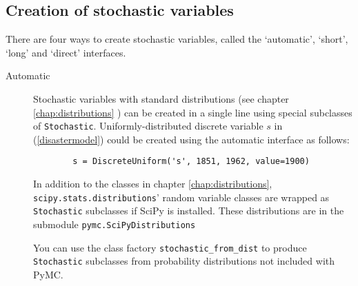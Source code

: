 \subsection{Creation of stochastic variables}
There are four ways to create stochastic variables, called the `automatic', `short', `long' and `direct' interfaces.

\begin{description}    
    \item[Automatic] Stochastic variables with standard distributions (see chapter \ref{chap:distributions} ) can be created in a single line using special subclasses of \texttt{Stochastic}. Uniformly-distributed discrete variable $s$ in (\ref{disastermodel}) could be created using the automatic interface as follows:
    \begin{verbatim}
        s = DiscreteUniform('s', 1851, 1962, value=1900)
    \end{verbatim}

    In addition to the classes in chapter \ref{chap:distributions}, \texttt{scipy.stats.distributions}' random variable classes are wrapped as \texttt{Stochastic} subclasses if SciPy is installed. These distributions are in the submodule \texttt{pymc.SciPyDistributions}

    You can use the class factory \texttt{stochastic_from_dist} to produce \texttt{Stochastic} subclasses from probability distributions not included with PyMC.%
    

\end{description}

